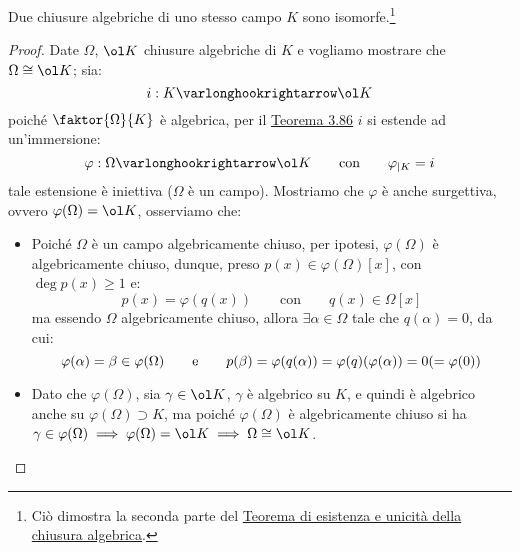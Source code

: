 \documentclass[11pt]{scrartcl}
\begin{document}
\pagebreak

\begin{corollary}
Due chiusure algebriche di uno stesso campo $K$ sono isomorfe.\footnote{Ciò dimostra la seconda parte del \hyperref[3.25]{Teorema di esistenza e unicità della chiusura algebrica}.}
\end{corollary}

\begin{proof}
Date $\Omega$, $\ol K$ chiusure algebriche di $K$ e vogliamo mostrare che $\Omega \cong \ol K$; sia:
\[ i : K \varlonghookrightarrow \ol K
    \]
poiché $\faktor{\Omega}{K}$ è algebrica, per il \hyperref[3.86]{Teorema 3.86} $i$ si estende ad un'immersione:
\[ \varphi : \Omega \varlonghookrightarrow \ol K \qquad \text{con} \qquad \varphi_{|K} = i
    \]
tale estensione è iniettiva ($\Omega$ è un campo). Mostriamo che $\varphi$ è anche surgettiva, ovvero $\varphi(\Omega) = \ol K$, osserviamo che:
\begin{itemize}
    \item Poiché $\Omega$ è un campo algebricamente chiuso, per ipotesi, $\varphi(\Omega)$ è algebricamente chiuso, dunque, preso $p(x) \in \varphi(\Omega)[x]$, con $\deg p(x) \geq 1$ e:
    \[ p(x) = \varphi(q(x)) \qquad \text{con} \qquad q(x) \in \Omega[x]
        \]
    ma essendo $\Omega$ algebricamente chiuso, allora $\exists \alpha \in \Omega$ tale che $q(\alpha) = 0$, da cui:
    \[ \varphi(\alpha) = \beta \in \varphi(\Omega) \qquad \text e \qquad p(\beta) = \varphi(q(\alpha)) = \varphi(q)(\varphi(\alpha)) = 0 (= \varphi(0))
        \]
    \item Dato che $\varphi(\Omega)$, sia $\gamma \in \ol K$, $\gamma$ è algebrico su $K$, e quindi è algebrico anche su $\varphi(\Omega) \supset K$, ma poiché $\varphi(\Omega)$ è algebricamente chiuso si ha 
    $\gamma \in \varphi(\Omega) \implies \varphi(\Omega) = \ol K \implies \Omega \cong \ol K$.
\end{itemize}
\end{proof}
\end{document}
